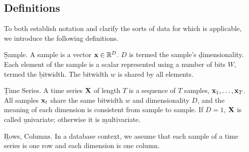 

\subsection{Definitions}

To both establish notation and clarify the sorts of data for which \minesp is applicable, we introduce the following definitions.

\begin{Definition} \b{Sample.} A sample is a vector $\mathbf{x} \in \mathbb{R}^D$. $D$ is termed the sample's \b{dimensionality}. Each element of the sample is a scalar represented using a number of bits $W$, termed the \b{bitwidth}. The bitwidth $w$ is shared by all elements.
\end{Definition}

\begin{Definition} \b{Time Series.} A time series $\mathbf{X}$ of length $T$ is a sequence of $T$ samples, $\mathbf{x}_1,\ldots,\mathbf{x}_T$. All samples $\mathbf{x}_t$ share the same bitwidth $w$ and dimensionality $D$, and the meaning of each dimension is consistent from sample to sample. If $D = 1$, $\mathbf{X}$ is called \b{univariate}; otherwise it is \b{multivariate}.
\end{Definition}

\begin{Definition} \b{Rows, Columns.} In a database context, we assume that each sample of a time series is one row and each dimension is one column.
\end{Definition}

